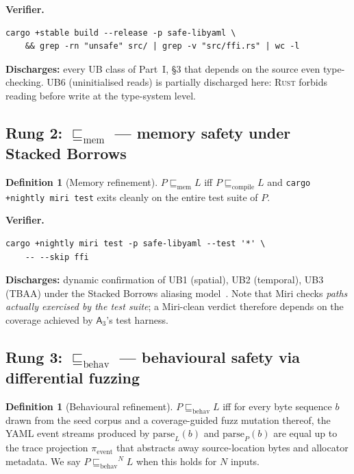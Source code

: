 \documentclass[12pt]{article}
\theoremstyle{definition}
\newtheorem{definition}[theorem]{Definition}
\theoremstyle{remark}
\newcommand{\rust}{\textnormal{\textsc{Rust}}}
\newcommand{\Agent}[1]{\ensuremath{\mathsf{#1}}}
\newcommand{\Compile}{\ensuremath{\sqsubseteq_{\!\mathrm{compile}}}}
\newcommand{\Memory}{\ensuremath{\sqsubseteq_{\!\mathrm{mem}}}}
\newcommand{\Behav}{\ensuremath{\sqsubseteq_{\!\mathrm{behav}}}}
\begin{document}
\textbf{Verifier.}
\begin{lstlisting}[style=bashstyle]
cargo +stable build --release -p safe-libyaml \
    && grep -rn "unsafe" src/ | grep -v "src/ffi.rs" | wc -l
\end{lstlisting}

\textbf{Discharges:} every UB class of Part~I, \S{}3 that depends on
the source even type-checking. UB6 (uninitialised reads) is partially
discharged here: \rust{} forbids reading before write at the
type-system level.

\subsection{Rung 2: $\Memory$ --- memory safety under Stacked Borrows}

\begin{definition}[Memory refinement]
\label{def:memory}
\(P \Memory L\) iff \(P \Compile L\) and \texttt{cargo +nightly miri
test} exits cleanly on the entire test suite of \(P\).
\end{definition}

\textbf{Verifier.}
\begin{lstlisting}[style=bashstyle]
cargo +nightly miri test -p safe-libyaml --test '*' \
    -- --skip ffi
\end{lstlisting}

\textbf{Discharges:} dynamic confirmation of UB1 (spatial), UB2
(temporal), UB3 (TBAA) under the Stacked Borrows aliasing
model~\cite{miri-popl2026}. Note that Miri checks \emph{paths actually
exercised by the test suite}; a Miri-clean verdict therefore depends on
the coverage achieved by \(\Agent{A}_3\)'s test harness.

\subsection{Rung 3: $\Behav$ --- behavioural safety via differential fuzzing}

\begin{definition}[Behavioural refinement]
\label{def:behav}
\(P \Behav L\) iff for every byte sequence \(b\) drawn from the seed
corpus and a coverage-guided fuzz mutation thereof, the YAML event
streams produced by \(\mathrm{parse}_L(b)\) and \(\mathrm{parse}_P(b)\)
are equal up to the trace projection \(\pi_{\mathrm{event}}\) that
abstracts away source-location bytes and allocator metadata. We say
\(P \Behav^{N} L\) when this holds for \(N\) inputs.
\end{definition}
\end{document}
